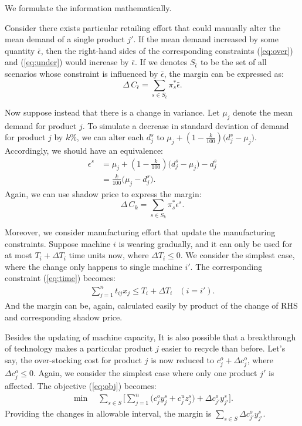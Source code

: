 \documentclass[a4paper,11pt]{article}
\begin{document}
We formulate the information mathematically.

Consider there exists particular retailing effort that could manually alter the mean demand of a single product $j'$. If the mean demand increased by some quantity $\bar{\epsilon}$, then the right-hand sides of the corresponding constraints (\ref{eq:over}) and (\ref{eq:under}) would increase by $\bar{\epsilon}$. If we denotes $S_{\bar{\epsilon}}$ to be the set of all scenarios whose constraint is influenced by $\bar{\epsilon}$, the margin can be expressed as:
\[
    \Delta \, C_{\bar{\epsilon}} = \sum_{s \in S_{\bar{\epsilon}}} \pi_s^* \bar{\epsilon}.
\]

Now suppose instead that there is a change in  variance. Let $\mu_j$ denote the mean demand for product $j$. To simulate a decrease in standard deviation of demand for product $j$ by $k\%$, we can alter each $d_j^s$ to $\mu_j + (1-\frac{k}{100}) \big( d_j^s - \mu_j \big)$. Accordingly, we should have an equivalence:
\[
\begin{aligned}
    \epsilon^s 
    & = \mu_j + (1-\frac{k}{100}) \big( d_j^s - \mu_j \big) - d_j^s\\
    & = \frac{k}{100} \big( \mu_j - d_j^s \big).
\end{aligned}
\]
Again, we can use shadow price to express the margin:
\[
    \Delta \, C_{k} = \sum_{s \in S_k} \pi_s^* \epsilon^s.
\]


Moreover, we consider manufacturing effort that update the manufacturing constraints. Suppose machine $i$ is wearing gradually, and it can only be used for at most $T_i + \Delta T_i$ time units now, where $\Delta T_i \leq 0$. We consider the simplest case, where the change only happens to single machine $i'$. The corresponding constraint (\ref{eq:time}) becomes:
\begin{eqnarray*}
    \sum_{j=1}^n t_{ij} x_j \le T_i + \Delta T_i	& (i = i').
\end{eqnarray*}
And the margin can be, again, calculated easily by product of the change of RHS and corresponding shadow price.

Besides the updating of machine capacity, It is also possible that a breakthrough of technology makes a particular product $j$ easier to recycle than before. Let's say, the over-stocking cost for product $j$ is now reduced to $c_j^o + \Delta c_j^o$, where $\Delta c_j^o \leq 0$. Again, we consider the simplest case where only one product $j'$ is affected. The objective (\ref{eq:obj}) becomes:
\begin{eqnarray*}
    \min \quad \sum_{s \in S} \big[ \sum_{j = 1}^n \big( c^o_j y_j^s + c^u_j z_j^s \big) + \Delta c_{j'}^o y_{j'}^s \big].
\end{eqnarray*}
Providing the changes in allowable interval, the margin is $\sum_{s \in S} \Delta c_{j'}^o y_{j'}^s$.
\end{document}
